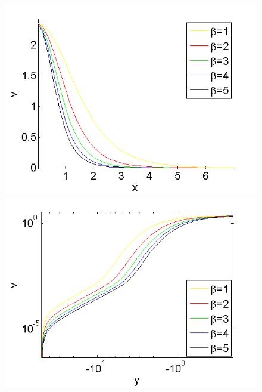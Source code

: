 \documentclass[a4paper]{article}
\theoremstyle{remark}
\begin{document}
\begin{large}
\begin{figure}[ht]
\begin{minipage}[b]{0.5\linewidth}
		 \includegraphics[width=\linewidth]{SolutionProfiles/ChristovIVY=0_ZB2_bt1_5_c017_h020_O(h^6).png}
	\end{minipage}
	\begin{minipage}[b]{0.5\linewidth}
		\raggedleft
		\includegraphics[width=\linewidth]{SolutionProfiles/ChristovIVLogX=0_ZB2_bt1_5_c017_h020_O(h^6).png}
	\end{minipage}	
	\begin{minipage}[b]{0.5\linewidth}
		\raggedright

\end{minipage}
\end{figure}
\end{large}
\end{document}
